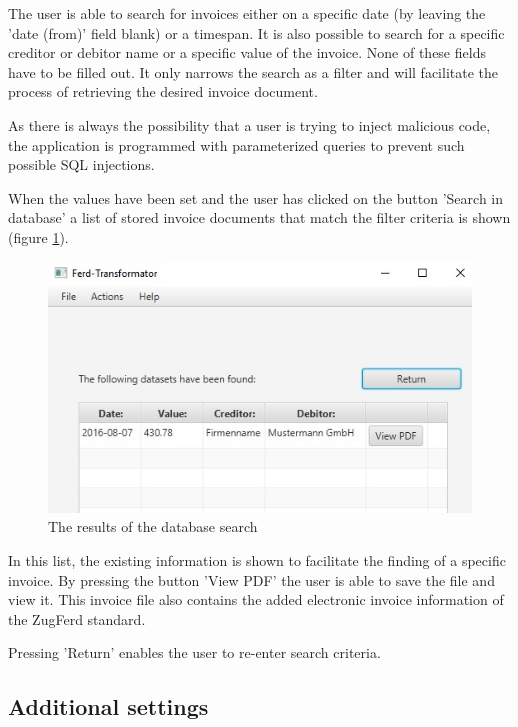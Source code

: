 The user is able to search for invoices either on a specific date (by leaving the 'date (from)' field blank) or a timespan.
It is also possible to search for a specific creditor or debitor name or a specific value of the invoice.
None of these fields have to be filled out. It only narrows the search as a filter and will facilitate the process of retrieving the desired invoice document.

As there is always the possibility that a user is trying to inject malicious code, the application is programmed with parameterized queries to prevent such possible SQL injections.

When the values have been set and the user has clicked on the button 'Search in database' a list of stored invoice documents that match the filter criteria is shown (figure \ref{searchResults}).

\begin{figure}[ht!]
\centering
\includegraphics[scale=0.6]{Images/GUI/SearchResults.jpg}
\caption{The results of the database search \label{searchResults}}
\end{figure}

In this list, the existing information is shown to facilitate the finding of a specific invoice. By pressing the button 'View PDF' the user is able to save the file and view it. This invoice file also contains the added electronic invoice information of the ZugFerd standard.

Pressing 'Return' enables the user to re-enter search criteria. 

\subsection{Additional settings}
\label{sec5.8.3}

